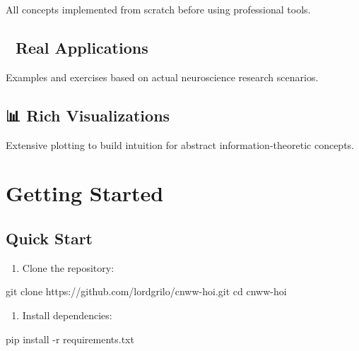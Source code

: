 \documentclass[
  11pt,
  letterpaper,
  oneside,
  openany]{book}
\newenvironment{Shaded}{\begin{snugshade}}{\end{snugshade}}
\newcommand{\AttributeTok}[1]{\textcolor[rgb]{0.40,0.45,0.13}{#1}}
\newcommand{\BuiltInTok}[1]{\textcolor[rgb]{0.00,0.23,0.31}{#1}}
\newcommand{\ExtensionTok}[1]{\textcolor[rgb]{0.00,0.23,0.31}{#1}}
\newcommand{\FunctionTok}[1]{\textcolor[rgb]{0.28,0.35,0.67}{#1}}
\newcommand{\NormalTok}[1]{\textcolor[rgb]{0.00,0.23,0.31}{#1}}
\providecommand{\tightlist}{%
  \setlength{\itemsep}{0pt}\setlength{\parskip}{0pt}}
\begin{document}
All concepts implemented from scratch before using professional tools.

\subsection*{🔬 Real Applications}\label{real-applications}

Examples and exercises based on actual neuroscience research scenarios.

\subsection*{📊 Rich Visualizations}\label{rich-visualizations}

Extensive plotting to build intuition for abstract information-theoretic
concepts.

\section*{Getting Started}\label{getting-started}


\subsection*{Quick Start}\label{quick-start}

\begin{enumerate}
\def\labelenumi{\arabic{enumi}.}
\tightlist
\item
  Clone the repository:
\end{enumerate}

\begin{Shaded}
\begin{Highlighting}[]
\FunctionTok{git}\NormalTok{ clone https://github.com/lordgrilo/cnww{-}hoi.git}
\BuiltInTok{cd}\NormalTok{ cnww{-}hoi}
\end{Highlighting}
\end{Shaded}

\begin{enumerate}
\def\labelenumi{\arabic{enumi}.}
\setcounter{enumi}{1}
\tightlist
\item
  Install dependencies:
\end{enumerate}

\begin{Shaded}
\begin{Highlighting}[]
\ExtensionTok{pip}\NormalTok{ install }\AttributeTok{{-}r}\NormalTok{ requirements.txt}
\end{Highlighting}
\end{Shaded}
\end{document}
